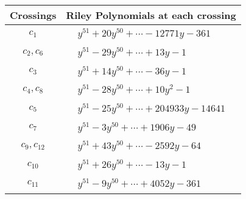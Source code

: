 \documentclass[1p]{elsarticle_modified}
\theoremstyle{definition}
\begin{document}
\begin{tabular}{m{50pt}|m{274pt}}
Crossings & \hspace{64pt}Riley Polynomials at each crossing \\
\hline $$\begin{aligned}c_{1}\end{aligned}$$&$\begin{aligned}
&y^{51}+20 y^{50}+\cdots-12771 y-361
\end{aligned}$\\
\hline $$\begin{aligned}c_{2},c_{6}\end{aligned}$$&$\begin{aligned}
&y^{51}-29 y^{50}+\cdots+13 y-1
\end{aligned}$\\
\hline $$\begin{aligned}c_{3}\end{aligned}$$&$\begin{aligned}
&y^{51}+14 y^{50}+\cdots-36 y-1
\end{aligned}$\\
\hline $$\begin{aligned}c_{4},c_{8}\end{aligned}$$&$\begin{aligned}
&y^{51}-28 y^{50}+\cdots+10 y^2-1
\end{aligned}$\\
\hline $$\begin{aligned}c_{5}\end{aligned}$$&$\begin{aligned}
&y^{51}-25 y^{50}+\cdots+204933 y-14641
\end{aligned}$\\
\hline $$\begin{aligned}c_{7}\end{aligned}$$&$\begin{aligned}
&y^{51}-3 y^{50}+\cdots+1906 y-49
\end{aligned}$\\
\hline $$\begin{aligned}c_{9},c_{12}\end{aligned}$$&$\begin{aligned}
&y^{51}+43 y^{50}+\cdots-2592 y-64
\end{aligned}$\\
\hline $$\begin{aligned}c_{10}\end{aligned}$$&$\begin{aligned}
&y^{51}+26 y^{50}+\cdots-13 y-1
\end{aligned}$\\
\hline $$\begin{aligned}c_{11}\end{aligned}$$&$\begin{aligned}
&y^{51}-9 y^{50}+\cdots+4052 y-361
\end{aligned}$\\
\hline
\end{tabular}\\~\\
\end{document}
